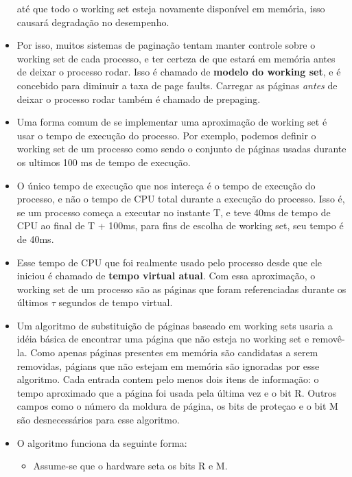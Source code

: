 \documentclass[10pt]{article}
\begin{document}
\begin{itemize}
        até que todo o working set esteja novamente disponível em memória, isso causará
        degradação no desempenho.
    \item Por isso, muitos sistemas de paginação tentam manter controle sobre o working
        set de cada processo, e ter certeza de que estará em memória antes de deixar o
        processo rodar. Isso é chamado de \textbf{modelo do working set}, e é concebido
        para diminuir a taxa de page faults. Carregar as páginas \textit{antes} de 
        deixar o processo rodar também é chamado de prepaging.
    \item Uma forma comum de se implementar uma aproximação de working set é usar o 
        tempo de execução do processo. Por exemplo, podemos definir o working set
        de um processo como sendo o conjunto de páginas usadas durante os ultimos
        100 ms de tempo de execução. 
    \item O único tempo de execução que nos intereça é o tempo de execução do processo,
        e não o tempo de CPU total durante a execução do processo. Isso é, se um processo
        começa a executar no instante T, e teve 40ms de tempo de CPU ao final de T + 100ms,
        para fins de escolha de working set, seu tempo é de 40ms.
    \item Esse tempo de CPU que foi realmente usado pelo processo desde que ele iniciou é
    chamado de \textbf{tempo virtual atual}. Com essa aproximação, o working set de um
    processo são as páginas que foram referenciadas durante os últimos
    \begin{math}\tau\end{math} segundos de tempo virtual.
    \item Um algoritmo de substituição de páginas baseado em working sets usaria a 
        idéia básica de encontrar uma página que não esteja no working set e 
        removê-la. Como apenas páginas presentes em memória são candidatas a serem
        removidas, págians que não estejam em memória são ignoradas por esse algoritmo.
        Cada entrada contem pelo menos dois itens de informação: o tempo aproximado
        que a página foi usada pela última vez e o bit R. Outros campos como o número
        da moldura de página, os bits de proteçao e o bit M são desnecessários para esse
        algoritmo.
    \item O algoritmo funciona da seguinte forma:
        \begin{itemize}
            \item Assume-se que o hardware seta os bits R e M.

\end{itemize}
\end{itemize}
\end{document}
